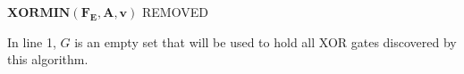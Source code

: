 \documentclass[journal]{IEEEtran}
\begin{document}
\begin{algo}\label{buildfdec}
\textbf{ $\boldsymbol{XORMIN(F_E, A,v)}$}
%
%
%
%
REMOVED
\end{algo}

\vspace{0.2cm}

In line 1,
$G$ is an empty set that will be used to hold all XOR gates discovered by this algorithm.
\end{document}
